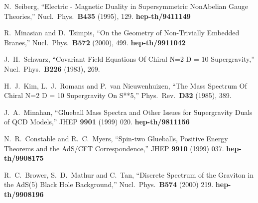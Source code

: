 \documentclass[12pt,epsf,a4paper]{article}
\begin{document}
\begin{thebibliography}{99}
N.~Seiberg,
``Electric - Magnetic Duality in Supersymmetric NonAbelian Gauge Theories,''
Nucl.\ Phys.\  {\bf B435} (1995), 129.
{\bf hep-th/9411149}

R.~Minasian and D.~Tsimpis,
``On the Geometry of Non-Trivially Embedded Branes,''
Nucl.\ Phys.\  {\bf B572} (2000), 499. {\bf hep-th/9911042}

J.~H.~Schwarz,
``Covariant Field Equations Of Chiral N=2 D = 10 Supergravity,''
Nucl.\ Phys.\  {\bf B226} (1983), 269.

H.~J.~Kim, L.~J.~Romans and P.~van Nieuwenhuizen,
``The Mass Spectrum Of Chiral N=2 D = 10 Supergravity On S**5,''
Phys.\ Rev.\  {\bf D32} (1985), 389.



J.~A.~Minahan,
``Glueball Mass Spectra and Other Issues for Supergravity Duals of {QCD} Models,''
JHEP {\bf 9901} (1999) 020.
{\bf hep-th/9811156}





N.~R.~Constable and R.~C.~Myers,
``Spin-two Glueballs, Positive Energy Theorems and the AdS/CFT  Correspondence,''
JHEP {\bf 9910} (1999) 037.
{\bf hep-th/9908175}






R.~C.~Brower, S.~D.~Mathur and C.~Tan,
``Discrete Spectrum of the Graviton in the AdS(5) Black Hole Background,''
Nucl.\ Phys.\  {\bf B574} (2000) 219.
{\bf hep-th/9908196}











\end{thebibliography}
\end{document}

